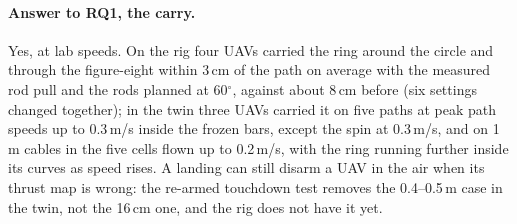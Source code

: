 \paragraph{Answer to RQ1, the carry.} Yes, at lab speeds. On the rig four UAVs carried the ring around the circle
and through the figure-eight within 3\,cm of the path on average with the measured rod pull and the rods planned at
60$^\circ$, against about 8\,cm before (six settings changed together); in the twin three UAVs carried it on five
paths at peak path speeds up to 0.3\,m/s inside the frozen bars, except the spin at 0.3\,m/s, and on 1\,m cables in the
five cells flown up to 0.2\,m/s, with the ring running further inside its curves as speed rises. A landing can still disarm a UAV in the air when its thrust
map is wrong: the re-armed touchdown test removes the 0.4--0.5\,m case in the twin, not the 16\,cm one, and the rig
does not have it yet.
